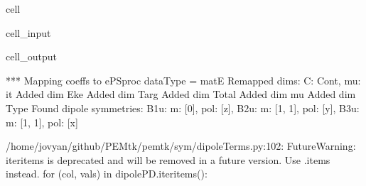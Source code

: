 \documentclass[letterpaper,table,10pt,english]{jupyterBook}
\begin{document}
\begin{sphinxuseclass}{cell}\begin{sphinxVerbatimInput}

\begin{sphinxuseclass}{cell_input}
\begin{sphinxVerbatim}[commandchars=\\\{\}]

   

  

  

\PYG{p}{[}\PYG{p}{]}
\end{sphinxVerbatim}

\end{sphinxuseclass}\end{sphinxVerbatimInput}
\begin{sphinxVerbatimOutput}

\begin{sphinxuseclass}{cell_output}
\begin{sphinxVerbatim}[commandchars=\\\{\}]
*** Mapping coeffs to ePSproc dataType = matE
Remapped dims: \PYGZob{}\PYGZsq{}C\PYGZsq{}: \PYGZsq{}Cont\PYGZsq{}, \PYGZsq{}mu\PYGZsq{}: \PYGZsq{}it\PYGZsq{}\PYGZcb{}
Added dim Eke
Added dim Targ
Added dim Total
Added dim mu
Added dim Type
Found dipole symmetries: 
\PYGZob{}\PYGZsq{}B1u\PYGZsq{}: \PYGZob{}\PYGZsq{}m\PYGZsq{}: [0], \PYGZsq{}pol\PYGZsq{}: [\PYGZsq{}z\PYGZsq{}]\PYGZcb{}, \PYGZsq{}B2u\PYGZsq{}: \PYGZob{}\PYGZsq{}m\PYGZsq{}: [\PYGZhy{}1, 1], \PYGZsq{}pol\PYGZsq{}: [\PYGZsq{}y\PYGZsq{}]\PYGZcb{}, \PYGZsq{}B3u\PYGZsq{}: \PYGZob{}\PYGZsq{}m\PYGZsq{}: [\PYGZhy{}1, 1], \PYGZsq{}pol\PYGZsq{}: [\PYGZsq{}x\PYGZsq{}]\PYGZcb{}\PYGZcb{}
\end{sphinxVerbatim}

\begin{sphinxVerbatim}[commandchars=\\\{\}]
/home/jovyan/github/PEMtk/pemtk/sym/\PYGZus{}dipoleTerms.py:102: FutureWarning: iteritems is deprecated and will be removed in a future version. Use .items instead.
  for (col, vals) in dipolePD.iteritems():
\end{sphinxVerbatim}


\end{sphinxuseclass}
\end{sphinxVerbatimOutput}
\end{sphinxuseclass}
\end{document}
